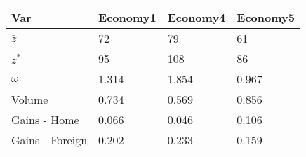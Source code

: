 \begin{tabular}{llll}
    \hline
    Var             & Economy1 & Economy4 & Economy5 \\ \hline
    $\bar{z}$       & 72       & 79       & 61       \\
    $\bar{z}^*$     & 95       & 108      & 86       \\
    $\omega$        & 1.314    & 1.854    & 0.967    \\
    Volume          & 0.734    & 0.569    & 0.856    \\
    Gains - Home    & 0.066    & 0.046    & 0.106    \\
    Gains - Foreign & 0.202    & 0.233    & 0.159    \\ \hline
\end{tabular}